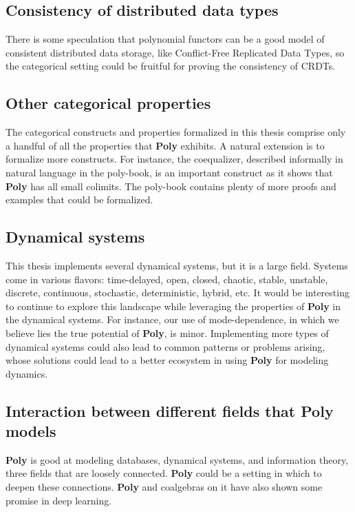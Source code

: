 \subsection{Consistency of distributed data types}
There is some speculation that polynomial functors can be a good model of consistent distributed data storage, like Conflict-Free Replicated Data Types, so the categorical setting could be fruitful for proving the consistency of CRDTs.

\subsection{Other categorical properties}
The categorical constructs and properties formalized in this thesis comprise only a handful of all the properties that \textbf{Poly} exhibits. A natural extension is to formalize more constructs. For instance, the coequalizer, described informally in natural language in the poly-book, is an important construct as it shows that \textbf{Poly} has all small colimits. The poly-book contains plenty of more proofs and examples that could be formalized. 

\subsection{Dynamical systems}
This thesis implements several dynamical systems, but it is a large field. Systems come in various flavors: time-delayed, open, closed, chaotic, stable, unstable, discrete, continuous, stochastic, deterministic, hybrid, etc. It would be interesting to continue to explore this landscape while leveraging the properties of \textbf{Poly} in the dynamical systems. For instance, our use of mode-dependence, in which we believe lies the true potential of \textbf{Poly}, is minor. Implementing more types of dynamical systems could also lead to common patterns or problems arising, whose solutions could lead to a better ecosystem in using \textbf{Poly} for modeling dynamics.

\subsection{Interaction between different fields that Poly models}

\textbf{Poly} is good at modeling databases, dynamical systems, and information theory, three fields that are loosely connected. \textbf{Poly} could be a setting in which to deepen these connections. \textbf{Poly} and coalgebras on it have also shown some promise in deep learning.

